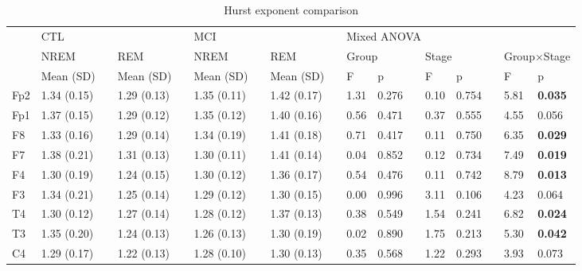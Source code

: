 \documentclass[10pt]{article}
\begin{document}
\setlength\tabcolsep{3pt}

\begin{table}
\caption{Hurst exponent comparison}
\begin{small}
\begin{tabular}{lllllllllllllllll}
\toprule
 & \multicolumn{3}{l}{CTL} & \phantom{.}  & \multicolumn{3}{l}{MCI} & \phantom{.} & \multicolumn{8}{l}{Mixed ANOVA} \\
\cmidrule{2-4} \cmidrule{6-8} \cmidrule{10-17}
 & NREM &  & REM   & & NREM &  & REM  &  & 
   \multicolumn{2}{l}{Group} &  & \multicolumn{2}{l}{Stage} & & \multicolumn{2}{l}{Group$\times$Stage}  \\
\cmidrule{2-2} \cmidrule{4-4} \cmidrule{6-6} \cmidrule{8-8} \cmidrule{10-11} \cmidrule{13-14} \cmidrule{16-17}    
 & Mean (SD) &  & Mean (SD) &  & Mean (SD) &  & Mean (SD) &  & F & p &  & F & p &  & F & p \\
\midrule
Fp2      & 1.34 (0.15)&  & 1.29 (0.13)&  & 1.35 (0.11)&  & 1.42 (0.17)&  & 1.31 & 0.276 &  & 0.10 & 0.754 &  & 5.81 &\bf 0.035 \\
Fp1      & 1.37 (0.15)&  & 1.29 (0.12)&  & 1.35 (0.12)&  & 1.40 (0.16)&  & 0.56 & 0.471 &  & 0.37 & 0.555 &  & 4.55 & 0.056 \\
F8       & 1.33 (0.16)&  & 1.29 (0.14)&  & 1.34 (0.19)&  & 1.41 (0.18)&  & 0.71 & 0.417 &  & 0.11 & 0.750 &  & 6.35 &\bf 0.029 \\
F7       & 1.38 (0.21)&  & 1.31 (0.13)&  & 1.30 (0.11)&  & 1.41 (0.14)&  & 0.04 & 0.852 &  & 0.12 & 0.734 &  & 7.49 &\bf 0.019 \\
F4       & 1.30 (0.19)&  & 1.24 (0.15)&  & 1.30 (0.12)&  & 1.36 (0.17)&  & 0.54 & 0.476 &  & 0.11 & 0.742 &  & 8.79 &\bf 0.013 \\
F3       & 1.34 (0.21)&  & 1.25 (0.14)&  & 1.29 (0.12)&  & 1.30 (0.15)&  & 0.00 & 0.996 &  & 3.11 & 0.106 &  & 4.23 & 0.064 \\
T4       & 1.30 (0.12)&  & 1.27 (0.14)&  & 1.28 (0.12)&  & 1.37 (0.13)&  & 0.38 & 0.549 &  & 1.54 & 0.241 &  & 6.82 &\bf 0.024 \\
T3       & 1.35 (0.20)&  & 1.24 (0.13)&  & 1.26 (0.13)&  & 1.30 (0.19)&  & 0.02 & 0.890 &  & 1.75 & 0.213 &  & 5.30 &\bf 0.042 \\
C4       & 1.29 (0.17)&  & 1.22 (0.13)&  & 1.28 (0.10)&  & 1.30 (0.13)&  & 0.35 & 0.568 &  & 1.22 & 0.293 &  & 3.93 & 0.073 \\

\end{tabular}
\end{small}
\end{table}
\end{document}
